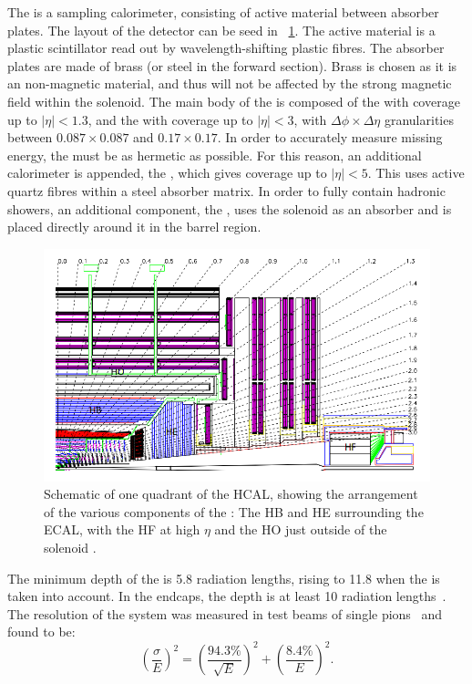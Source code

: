 The \CMS \HCAL is a sampling calorimeter, consisting of active material between absorber plates. The layout of the detector can be seed in \Fig~\ref{fig:hcal}. The active material is a plastic scintillator read out by wavelength-shifting plastic fibres. The absorber plates are made of brass (or steel in the forward section). Brass is chosen as it is an non-magnetic material, and thus will not be affected by the strong magnetic field within the solenoid. The main body of the \HCAL is composed of the \HB with coverage up to $|\eta| < 1.3$, and the \HE with coverage up to $|\eta| < 3$, with $\Delta\phi \times \Delta\eta$ granularities between $0.087 \times 0.087$ and $ 0.17 \times 0.17$. In order to accurately measure missing energy, the \HCAL must be as hermetic as possible. For this reason, an additional calorimeter is appended, the \HF, which gives coverage up to $|\eta| <5$. This uses active quartz fibres within a steel absorber matrix. In order to fully contain hadronic showers, an additional component, the \HO, uses the solenoid as an absorber and is placed directly around it in the barrel region.~\cite{cmsHcal} 

\begin{figure}[h]
\centering
\includegraphics[width=1.0\textwidth]{detectorFigures/cms_hcal.png}
\caption{Schematic \crosssection of one quadrant of the HCAL, showing the arrangement of the various components of the \subdetector: The HB and HE surrounding the ECAL, with the HF at high $\eta$ and the HO just outside of the solenoid \cite{CMSatLHC}.}
\label{fig:hcal}
\end{figure}

The minimum depth of the \HB is 5.8 radiation lengths, rising to 11.8 when the \HO is taken into account. In the endcaps, the depth is at least 10 radiation lengths~\cite{cmsHcal}. The resolution of the \HCAL system was measured in test beams of single pions~\cite{Abdullin:2009zz} and found to be:
\begin{equation}
\label{eq:HCALresol}
\left( \frac{\sigma}{E}\right) ^2= \left( \frac{94.3\%}{\sqrt{E}} \right)^2 + \left( \frac{8.4\%}{E} \right)^2.
\end{equation}

